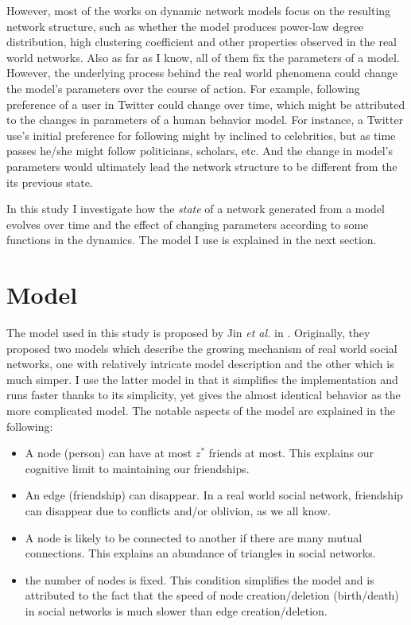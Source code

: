 \documentclass{article}
\begin{document}
However, most of the works on dynamic network models focus on the resulting network structure, such as whether the model produces power-law degree distribution, high clustering coefficient and other properties observed in the real world networks. Also as far as I know, all of them fix the parameters of a model. However, the underlying process behind the real world phenomena could change the model's parameters over the course of action. For example, following preference of a user in Twitter could change over time, which might be attributed to the changes in parameters of a human behavior model. For instance, a Twitter use's initial preference for following might by inclined to celebrities, but as time passes he/she might follow politicians, scholars, etc. And the change in model's parameters would ultimately lead the network structure to be different from the its previous state.

In this study I investigate how the \textit{state} of a network  generated from a model evolves over time and the effect of changing parameters according to some functions in the dynamics. The model I use is explained in the next section.

\section{Model}
The model used in this study is proposed by Jin \textit{et al.} in \cite{PhysRevE.64.046132}. Originally, they proposed two models which describe the growing mechanism of real world social networks, one with relatively intricate model description and the other which is much simper. I use the latter model in that it simplifies the implementation and runs faster thanks to its simplicity, yet gives the almost identical behavior as the more complicated model. The notable aspects of the model are explained in the following:
\begin{itemize}
\item A node (person) can have at most $z^*$ friends at most. This explains our cognitive limit to maintaining our friendships.
\item An edge (friendship) can disappear. In a real world social network, friendship can disappear due to conflicts and/or oblivion, as we all know.
\item A node is likely to be connected to another if there are many mutual connections. This explains an abundance of triangles in social networks.
\item the number of nodes is fixed. This condition simplifies the model and is attributed to the fact that the speed of node creation/deletion (birth/death) in social networks is much slower than edge creation/deletion.
\end{itemize}
\end{document}
